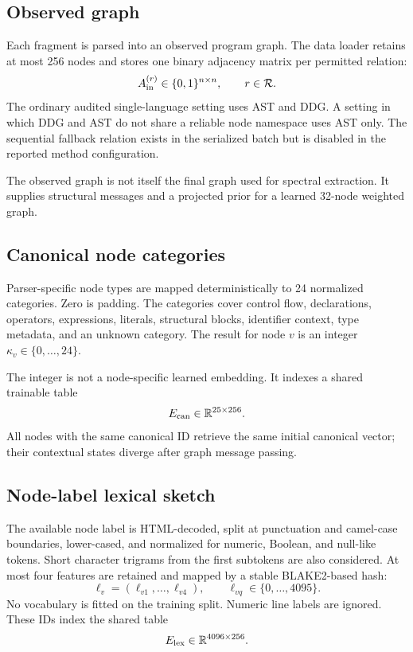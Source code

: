\documentclass[11pt,a4paper]{article}
\newcommand{\R}{\mathbb{R}}
\begin{document}
\subsection{Observed graph}

Each fragment is parsed into an observed program graph. The data loader retains
at most 256 nodes and stores one binary adjacency matrix per permitted relation:
\begin{equation}
A_{\rm in}^{(r)}\in\{0,1\}^{n\times n},
\qquad r\in\mathcal R.
\end{equation}
The ordinary audited single-language setting uses AST and DDG. A setting in
which DDG and AST do not share a reliable node namespace uses AST only. The
sequential fallback relation exists in the serialized batch but is disabled in
the reported method configuration.

The observed graph is not itself the final graph used for spectral extraction.
It supplies structural messages and a projected prior for a learned 32-node
weighted graph.

\subsection{Canonical node categories}

Parser-specific node types are mapped deterministically to 24 normalized
categories. Zero is padding. The categories cover control flow, declarations,
operators, expressions, literals, structural blocks, identifier context, type
metadata, and an unknown category. The result for node $v$ is an integer
$\kappa_v\in\{0,\ldots,24\}$.

The integer is not a node-specific learned embedding. It indexes a shared
trainable table
\begin{equation}
E_{\rm can}\in\R^{25\times256}.
\end{equation}
All nodes with the same canonical ID retrieve the same initial canonical vector;
their contextual states diverge after graph message passing.

\subsection{Node-label lexical sketch}

The available node label is HTML-decoded, split at punctuation and camel-case
boundaries, lower-cased, and normalized for numeric, Boolean, and null-like
tokens. Short character trigrams from the first subtokens are also considered.
At most four features are retained and mapped by a stable BLAKE2-based hash:
\begin{equation}
\ell_v=(\ell_{v1},\ldots,\ell_{v4}),
\qquad \ell_{vq}\in\{0,\ldots,4095\}.
\end{equation}
No vocabulary is fitted on the training split. Numeric line labels are ignored.
These IDs index the shared table
\begin{equation}
E_{\rm lex}\in\R^{4096\times256}.
\end{equation}
\end{document}
